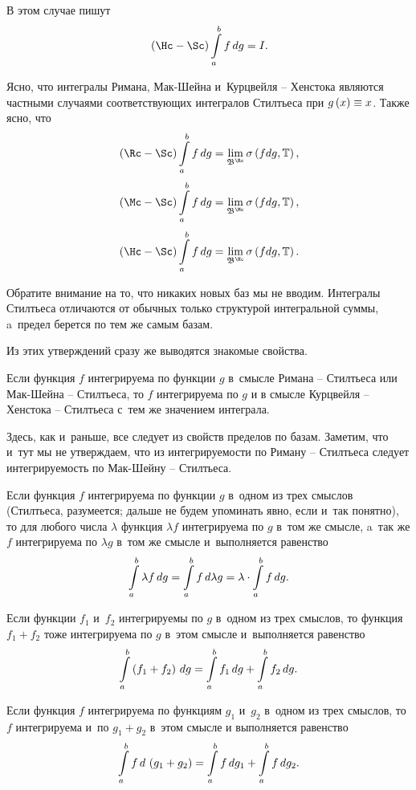 \documentclass[draft]{article}
\begin{document}
В этом случае пишут $$\kurzhst\intabfdg=I.$$

\bigskip

Ясно, что интегралы Римана, Мак-Шейна и~Курцвейля -- Хенстока
являются частными случаями соответствующих интегралов Стилтьеса при
$g\atx\equiv x$. Также ясно, что
$$\rimanst\intabfdg=\lim_{\baseriman}\isfdgT,$$
$$\macshst\intabfdg=\lim_{\basemacsh}\isfdgT,$$
$$\kurzhst\intabfdg=\lim_{\basekurzh}\isfdgT.$$

Обратите внимание на то, что никаких новых баз мы не вводим.
Интегралы Стилтьеса отличаются от обычных только структурой
интегральной суммы, a~предел берется по тем же самым базам.

\eject

Из этих утверждений сразу же выводятся знакомые свойства.

\bigskip


Если функция $f$ интегрируема по функции $g$ в~смысле Римана --
Стилтьеса или Мак-Шейна -- Стилтьеса, то $f$ интегрируема по $g$ и в
смысле Курцвейля -- Хенстока -- Стилтьеса с~тем же значением
интеграла.

\pr

Здесь, как и~раньше, все следует из свойств пределов по базам.
Заметим, что и~тут мы не утверждаем, что из интегрируемости по
Риману -- Стилтьеса следует интегрируемость по Мак-Шейну --
Стилтьеса.

\prut

\bigskip


Если функция $f$ интегрируема по функции $g$ в~одном из трех смыслов
(Стилтьеса, разумеется; дальше не будем упоминать явно, если и~так
понятно), то для любого числа $\lambda$ функция $\lambda f$
интегрируема по $g$ в~том же смысле, a~так же $f$ интегрируема по
$\lambda g$ в~том же смысле и~выполняется равенство
$$\intab{\lambda f},g=\intab f,{\lambda g}=\lambda\cdot\intabfdg.$$

Если функции $f_1$ и~$f_2$ интегрируемы по $g$ в~одном из трех
смыслов, то функция $f_1 + f_2$ тоже интегрируема по $g$ в~этом
смысле и~выполняется равенство $$\intab\at(f_1+f_2),g=\intab
{f_1},g+\intab {f_2},g.$$

Если функция $f$ интегрируема по функциям $g_1$ и~$g_2$ в~одном из
трех смыслов, то $f$ интегрируема и~по $g_1 + g_2$ в~этом смысле и
выполняется равенство $$\intab f,{\,\at(g_1+g_2)}=\intab
f,{g_1}+\intab f,{g_2}.$$
\end{document}
